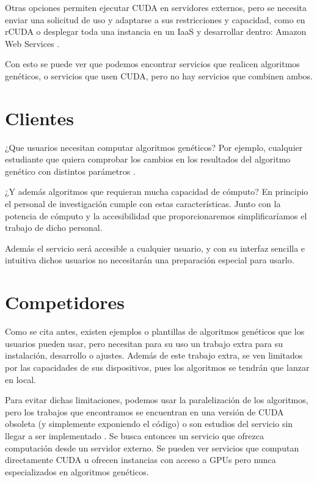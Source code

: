 \bigskip
Otras opciones permiten ejecutar CUDA en servidores externos, pero se necesita enviar una solicitud de uso y adaptarse a sus restricciones y capacidad, como en rCUDA \cite{rcuda}
o desplegar toda una instancia en un IaaS y desarrollar dentro: Amazon Web Services \cite{amazoncuda}.

\bigskip
Con esto se puede ver que podemos encontrar servicios que realicen algoritmos genéticos, o servicios que usen CUDA, pero no hay servicios que combinen ambos.


\bigskip
\section{Clientes}
\bigskip

¿Que usuarios necesitan computar algoritmos genéticos?
Por ejemplo, cualquier estudiante que quiera comprobar los cambios en los resultados del algoritmo genético con distintos parámetros .

¿Y además algoritmos que requieran mucha capacidad de cómputo? En principio el personal de investigación cumple con estas características. Junto con la potencia de cómputo y la accesibilidad que proporcionaremos simplificaríamos el trabajo de dicho personal. 

Además el servicio será accesible a cualquier usuario, y con su interfaz sencilla e intuitiva dichos usuarios no necesitarán una preparación especial para usarlo. 

\bigskip
\section{Competidores}
\bigskip

Como se cita antes, existen ejemplos o plantillas de algoritmos genéticos \cite{agpython} \cite{agjava} \cite{agmatlab} que los usuarios pueden usar, pero necesitan para su uso un trabajo extra para su instalación, desarrollo o ajustes. Además de este trabajo extra, se ven limitados por las capacidades de sus dispositivos, pues los algoritmos se tendrán que lanzar en local.

Para evitar dichas limitaciones, podemos usar la paralelización de los algoritmos, pero los trabajos que encontramos se encuentran en una versión de CUDA obsoleta \cite{paralelizacioncuda} (y simplemente exponiendo el código) o son estudios del servicio sin llegar a ser implementado \cite{optimizacionparalelizacioncuda}. Se busca entonces un servicio que ofrezca computación desde un servidor externo. Se pueden ver servicios que computan directamente CUDA \cite{rcuda} u ofrecen instancias con acceso a GPUs \cite{amazoncuda}  pero nunca especializados en algoritmos genéticos.


